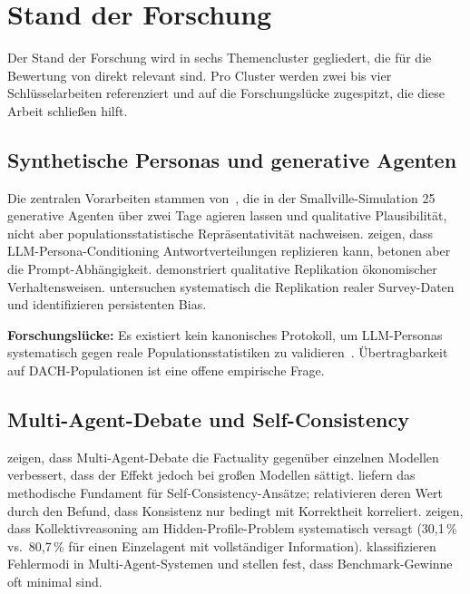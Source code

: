 
\chapter{Stand der Forschung}\label{ch:related}

Der Stand der Forschung wird in sechs Themencluster gegliedert, die für die Bewertung von \agora{} direkt relevant sind. Pro Cluster werden zwei bis vier Schlüsselarbeiten referenziert und auf die Forschungslücke zugespitzt, die diese Arbeit schließen hilft.

\section{Synthetische Personas und generative Agenten}\label{sec:personas}

Die zentralen Vorarbeiten stammen von~\cite{park2023generative}, die in der Smallville-Simulation 25 generative Agenten über zwei Tage agieren lassen und qualitative Plausibilität, nicht aber populationsstatistische Repräsentativität nachweisen. \cite{argyle2023silicon} zeigen, dass LLM-Persona-Conditioning Antwortverteilungen replizieren kann, betonen aber die Prompt-Abhängigkeit. \cite{horton2023homosilicus} demonstriert qualitative Replikation ökonomischer Verhaltensweisen. \cite{uas2025} untersuchen systematisch die Replikation realer Survey-Daten und identifizieren persistenten Bias.

\textbf{Forschungslücke:} Es existiert kein kanonisches Protokoll, um LLM-Personas systematisch gegen reale Populationsstatistiken zu validieren~\cite{task-f-literature-note}. Übertragbarkeit auf DACH-Populationen ist eine offene empirische Frage.

\section{Multi-Agent-Debate und Self-Consistency}\label{sec:debate}

\cite{du2023multiagent} zeigen, dass Multi-Agent-Debate die Factuality gegenüber einzelnen Modellen verbessert, dass der Effekt jedoch bei großen Modellen sättigt. \cite{wang2022selfconsistency} liefern das methodische Fundament für Self-Consistency-Ansätze; \cite{consistency2024} relativieren deren Wert durch den Befund, dass Konsistenz nur bedingt mit Korrektheit korreliert. \cite{hiddenbench2025} zeigen, dass Kollektivreasoning am Hidden-Profile-Problem systematisch versagt (30,1\,\% vs.\ 80,7\,\% für einen Einzelagent mit vollständiger Information). \cite{mast2025} klassifizieren Fehlermodi in Multi-Agent-Systemen und stellen fest, dass Benchmark-Gewinne oft minimal sind.


